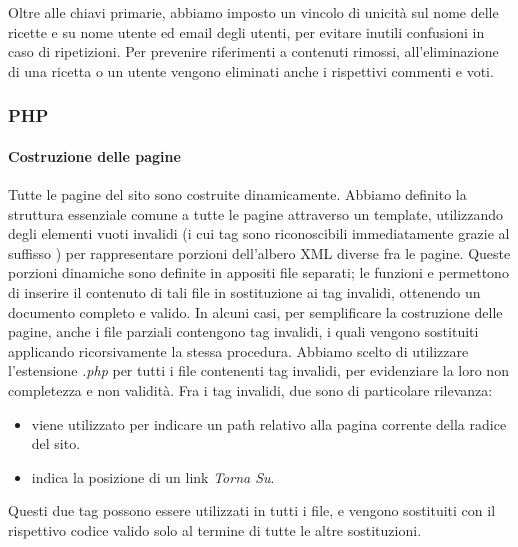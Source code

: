 Oltre alle chiavi primarie, abbiamo imposto un vincolo di unicità sul nome delle ricette e su nome utente ed email degli utenti, per evitare inutili confusioni in caso di ripetizioni.
Per prevenire riferimenti a contenuti rimossi, all'eliminazione di una ricetta o un utente vengono eliminati anche i rispettivi commenti e voti.

\subsubsection{PHP}\label{subs:php}
\paragraph{Costruzione delle pagine}
Tutte le pagine del sito sono costruite dinamicamente.
Abbiamo definito la struttura essenziale comune a tutte le pagine attraverso un template, utilizzando degli elementi vuoti invalidi (i cui tag sono riconoscibili immediatamente grazie al suffisso ) per rappresentare porzioni dell'albero XML diverse fra le pagine.
Queste porzioni dinamiche sono definite in appositi file separati; le funzioni  e  permettono di inserire il contenuto di tali file in sostituzione ai tag invalidi, ottenendo un documento completo e valido.
In alcuni casi, per semplificare la costruzione delle pagine, anche i file parziali contengono tag invalidi, i quali vengono sostituiti applicando ricorsivamente la stessa procedura.
Abbiamo scelto di utilizzare l'estensione \textit{.php} per tutti i file contenenti tag invalidi, per evidenziare la loro non completezza e non validità.
Fra i tag invalidi, due sono di particolare rilevanza:
\begin{itemize}
	\item {} viene utilizzato per indicare un path relativo alla pagina corrente della radice del sito.
	\item {} indica la posizione di un link \textit{Torna Su}.
\end{itemize}
Questi due tag possono essere utilizzati in tutti i file, e vengono sostituiti con il rispettivo codice valido solo al termine di tutte le altre sostituzioni.

